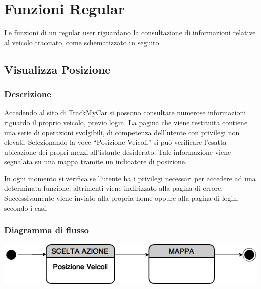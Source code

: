 \documentclass[a4paper,12pt]{article}
\begin{document}
\section{Funzioni Regular}
Le funzioni di un regular user riguardano la consultazione di informazioni relative al veicolo tracciato, come schematizzato in seguito.
\begin{center}
\end{center}

\subsection{Visualizza Posizione}
\subsubsection{Descrizione}
Accedendo al sito di TrackMyCar si possono consultare numerose informazioni riguardo il proprio veicolo, previo login. La pagina che viene restituita contiene una serie di operazioni svolgibili, di competenza dell'utente con privilegi non elevati. Selezionando la voce ``Posizione Veicoli'' si può verificare l'esatta ubicazione dei propri mezzi all'istante desiderato. Tale informazione viene segnalata su una mappa tramite un indicatore di posizione. 

In ogni momento si verifica se l'utente ha i privilegi necessari per accedere ad una determinata funzione, altrimenti viene indirizzato alla pagina di errore. Successivamente viene inviato alla propria home oppure alla pagina di login, secondo i casi.
\subsubsection{Diagramma di flusso}

\begin{center}
\includegraphics[scale=0.62]{Posizione.png}
\end{center}
\end{document}
